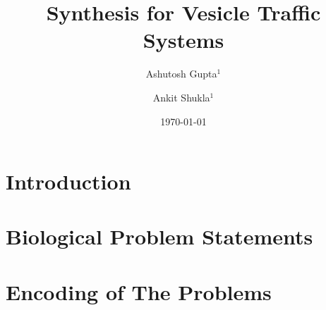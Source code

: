 \documentclass{llncs}
\begin{document}
\title{Synthesis for Vesicle Traffic Systems}

\author{Ashutosh Gupta$^1$ \and Ankit Shukla$^1$}


\date{\today}

\maketitle

\begin{abstract}

\end{abstract}

\section{Introduction}
\label{sec:intro}
% 
% 

\section{Biological Problem Statements}
\label{sec:bio}
% 
% 

\section{Encoding of The Problems}
\label{sec:encoding}


% 

% 

% 



\end{document}
